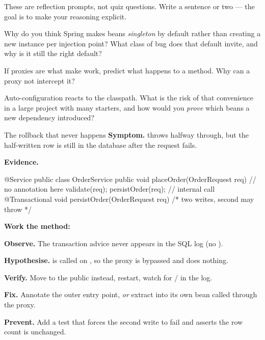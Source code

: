 
These are reflection prompts, not quiz questions. Write a sentence or two — the goal is to make your reasoning explicit.

\begin{thinkbox}
Why do you think Spring makes beans \emph{singleton} by default rather than creating a new instance per injection point? What class of bug does that default invite, and why is it still the right default?
\end{thinkbox}

\begin{thinkbox}
If proxies are what make  work, predict what happens to a   method. Why can a proxy not intercept it?
\end{thinkbox}

\begin{thinkbox}
Auto-configuration reacts to the classpath. What is the risk of that convenience in a large project with many starters, and how would you \emph{prove} which beans a new dependency introduced?
\end{thinkbox}


\begin{debuglab}{The rollback that never happens}
\textbf{Symptom.}  throws halfway through, but the half-written row is still in the database after the request fails.

\smallskip\textbf{Evidence.}
\begin{javabox}
@Service
public class OrderService {
  public void placeOrder(OrderRequest req) {   // no annotation here
    validate(req);
    persistOrder(req);            // internal call
  }
  @Transactional
  void persistOrder(OrderRequest req) { /* two writes, second may throw */ }
}
\end{javabox}

\textbf{Work the method:}
\begin{tickcheck}
  \item \textbf{Observe.} The transaction advice never appears in the SQL log (no ).
  \item \textbf{Hypothesise.}  is called on , so the proxy is bypassed and  does nothing.
  \item \textbf{Verify.} Move  to the public  instead, restart, watch for / in the log.
  \item \textbf{Fix.} Annotate the outer entry point, \emph{or} extract  into its own bean called through the proxy.
  \item \textbf{Prevent.} Add a test that forces the second write to fail and asserts the row count is unchanged.
\end{tickcheck}
\end{debuglab}

